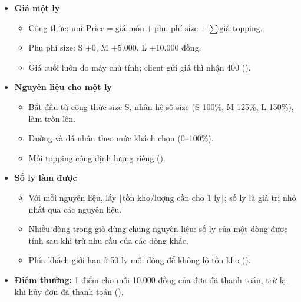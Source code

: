 \begin{itemize}
\item \textbf{Giá một ly}
  \begin{itemize}
  \item Công thức: $\text{unitPrice} = \text{giá món} + \text{phụ phí size} + \sum \text{giá topping}$.
  \item Phụ phí size: S +0, M +5.000, L +10.000 đồng.
  \item Giá cuối luôn do máy chủ tính; client gửi giá thì nhận 400 ().
  \end{itemize}
\item \textbf{Nguyên liệu cho một ly}
  \begin{itemize}
  \item Bắt đầu từ công thức size S, nhân hệ số size (S 100\%, M 125\%, L 150\%), làm tròn lên.
  \item Đường và đá nhân theo mức khách chọn (0--100\%).
  \item Mỗi topping cộng định lượng riêng ().
  \end{itemize}
\item \textbf{Số ly làm được}
  \begin{itemize}
  \item Với mỗi nguyên liệu, lấy $\lfloor \text{tồn kho} / \text{lượng cần cho 1 ly} \rfloor$; số ly là giá trị nhỏ nhất qua các nguyên liệu.
  \item Nhiều dòng trong giỏ dùng chung nguyên liệu: số ly của một dòng được tính sau khi trừ nhu cầu của các dòng khác.
  \item Phía khách giới hạn ở 50 ly mỗi dòng để không lộ tồn kho ().
  \end{itemize}
\item \textbf{Điểm thưởng:} 1 điểm cho mỗi 10.000 đồng của đơn đã thanh toán, trừ lại khi hủy đơn đã thanh toán ().
\end{itemize}
